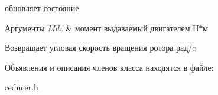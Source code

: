 обновляет состояние 


\begin{DoxyParams}{Аргументы}
{\em Mdv} & момент выдаваемый двигателем Н$\ast$м \\
\hline
\end{DoxyParams}
\begin{DoxyReturn}{Возвращает}
угловая скорость вращения ротора рад/c 
\end{DoxyReturn}


Объявления и описания членов класса находятся в файле\+:\begin{DoxyCompactItemize}
\item 
reducer.\+h\end{DoxyCompactItemize}
